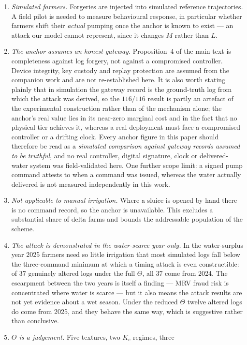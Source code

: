 \begin{enumerate}
\item \emph{Simulated farmers.} Forgeries are injected into simulated reference
trajectories. A field pilot is needed to measure behavioural response, in
particular whether farmers shift their \emph{actual} pumping once the anchor is
known to exist --- an attack our model cannot represent, since it changes $M$
rather than $L$.
\item \emph{The anchor assumes an honest gateway.}
Proposition~4 of the main text is completeness against log forgery, not against
a compromised controller. Device integrity, key custody and replay protection
are assumed from the companion work and are not re-established here. It is also
worth stating plainly that in simulation the gateway record is the ground-truth
log from which the attack was derived, so the $116/116$ result is partly an
artefact of the experimental construction rather than of the mechanism alone;
the anchor's real value lies in its near-zero marginal cost and in the fact that
no physical tier achieves it, whereas a real deployment must face a compromised
controller or a drifting clock. Every anchor figure in this paper should therefore be
read as a \emph{simulated comparison against gateway records assumed to be truthful},
and no real controller, digital signature, clock or delivered-water system was
field-validated here. One further scope limit: a signed pump command attests to when a
command was issued, whereas the water actually delivered is not measured independently
in this work.
\item \emph{Not applicable to manual irrigation.} Where a sluice is opened by
hand there is no command record, so the anchor is unavailable. This excludes a
substantial share of delta farms and bounds the addressable population of the
scheme.
\item \emph{The attack is demonstrated in the water-scarce year only.} In the
water-surplus year 2025 farmers need so little irrigation that most simulated
logs fall below the three-command minimum at which a timing attack is even
constructible: of $37$ genuinely altered logs under the full $\Theta$, all $37$
come from 2024. The escarpment between the two years is itself a finding --- MRV
fraud risk is concentrated where water is scarce --- but it also means the
attack results are not yet evidence about a wet season. Under the reduced
$\Theta$ twelve altered logs do come from 2025, and they behave the same way,
which is suggestive rather than conclusive.
\item \emph{$\Theta$ is a judgement.} Five textures, two $K_c$ regimes, three

\end{enumerate}
